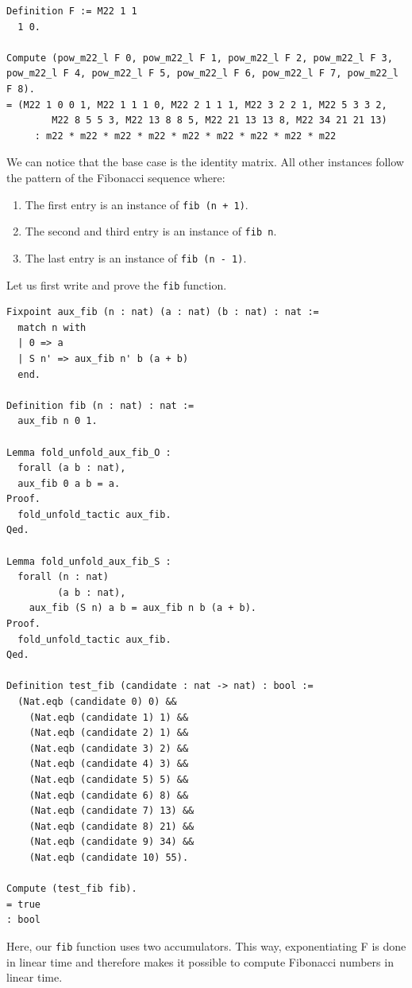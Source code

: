 \documentclass{article}
\begin{document}
\begin{lstlisting}
Definition F := M22 1 1
  1 0.

Compute (pow_m22_l F 0, pow_m22_l F 1, pow_m22_l F 2, pow_m22_l F 3, pow_m22_l F 4, pow_m22_l F 5, pow_m22_l F 6, pow_m22_l F 7, pow_m22_l F 8).
= (M22 1 0 0 1, M22 1 1 1 0, M22 2 1 1 1, M22 3 2 2 1, M22 5 3 3 2, 
        M22 8 5 5 3, M22 13 8 8 5, M22 21 13 13 8, M22 34 21 21 13)
     : m22 * m22 * m22 * m22 * m22 * m22 * m22 * m22 * m22
\end{lstlisting}

We can notice that the base case is the identity matrix. All other instances follow the pattern of the Fibonacci sequence where:
\begin{enumerate}
  \item The first entry is an instance of \texttt{fib (n + 1)}.
  \item The second and third entry is an instance of \texttt{fib n}.
  \item The last entry is an instance of \texttt{fib (n - 1)}.
\end{enumerate}

Let us first write and prove the \texttt{fib} function.

\begin{lstlisting}
Fixpoint aux_fib (n : nat) (a : nat) (b : nat) : nat :=
  match n with
  | 0 => a
  | S n' => aux_fib n' b (a + b)
  end.

Definition fib (n : nat) : nat :=
  aux_fib n 0 1.

Lemma fold_unfold_aux_fib_O :
  forall (a b : nat),
  aux_fib 0 a b = a.
Proof.
  fold_unfold_tactic aux_fib.
Qed.

Lemma fold_unfold_aux_fib_S :
  forall (n : nat)
         (a b : nat),
    aux_fib (S n) a b = aux_fib n b (a + b).
Proof.
  fold_unfold_tactic aux_fib.
Qed.

Definition test_fib (candidate : nat -> nat) : bool :=
  (Nat.eqb (candidate 0) 0) &&
    (Nat.eqb (candidate 1) 1) &&
    (Nat.eqb (candidate 2) 1) &&
    (Nat.eqb (candidate 3) 2) &&
    (Nat.eqb (candidate 4) 3) &&
    (Nat.eqb (candidate 5) 5) &&
    (Nat.eqb (candidate 6) 8) &&
    (Nat.eqb (candidate 7) 13) &&
    (Nat.eqb (candidate 8) 21) &&
    (Nat.eqb (candidate 9) 34) &&
    (Nat.eqb (candidate 10) 55).

Compute (test_fib fib).
= true
: bool
\end{lstlisting}

Here, our \texttt{fib} function uses two accumulators. This way, exponentiating F is done in linear time and therefore makes it possible to compute Fibonacci numbers in linear time.
\end{document}
